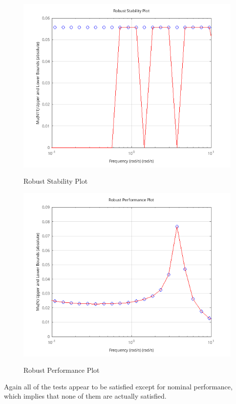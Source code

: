 \documentclass{article}
\begin{document}
\begin{figure}[H]
    \centering
    \includegraphics[width=\textwidth]{3nbrs.png}
    \label{fig:3nbrs}
    \caption{Robust Stability Plot}
\end{figure}

\begin{figure}[H]
    \centering
    \includegraphics[width=\textwidth]{3nbrp.png}
    \label{fig:3nbrp}
    \caption{Robust Performance Plot}
\end{figure}

Again all of the tests appear to be satisfied except for nominal performance, which implies that none of them are actually satisfied.
\end{document}

